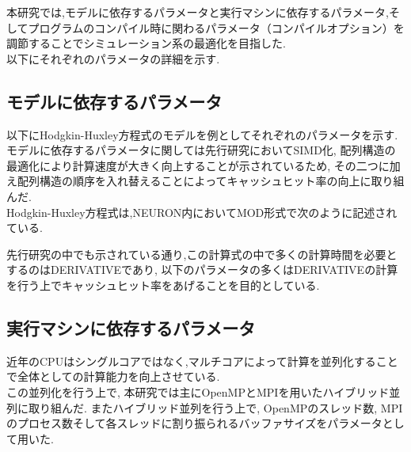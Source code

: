 \label{sec:algorithm}
本研究では,モデルに依存するパラメータと実行マシンに依存するパラメータ,そしてプログラムのコンパイル時に関わるパラメータ（コンパイルオプション）を調節することでシミュレーション系の最適化を目指した.\\
以下にそれぞれのパラメータの詳細を示す.\\
\subsection{モデルに依存するパラメータ}
以下にHodgkin-Huxley方程式のモデルを例としてそれぞれのパラメータを示す.\\
モデルに依存するパラメータに関しては先行研究\cite{miyamoto-master}においてSIMD化, 配列構造の最適化により計算速度が大きく向上することが示されているため,
その二つに加え配列構造の順序を入れ替えることによってキャッシュヒット率の向上に取り組んだ.\\
Hodgkin-Huxley方程式は,NEURON内においてMOD形式で次のように記述されている.\\
{\footnotesize

}
先行研究の中でも示されている通り,この計算式の中で多くの計算時間を必要とするのはDERIVATIVEであり,
以下のパラメータの多くはDERIVATIVEの計算を行う上でキャッシュヒット率をあげることを目的としている.\\




\subsection{実行マシンに依存するパラメータ}
近年のCPUはシングルコアではなく,マルチコアによって計算を並列化することで全体としての計算能力を向上させている.\\
この並列化を行う上で, 本研究では主にOpenMPとMPIを用いたハイブリッド並列に取り組んだ. またハイブリッド並列を行う上で,
OpenMPのスレッド数, MPIのプロセス数そして各スレッドに割り振られるバッファサイズをパラメータとして用いた.\\






